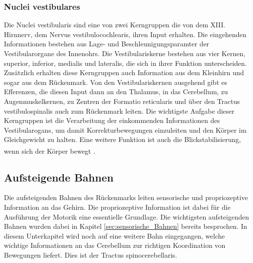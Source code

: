 \documentclass[12pt,a4paper,pdftex]{article}
\begin{document}
\subsubsection*{Nuclei vestibulares} 
Die Nuclei vestibularis sind eine von zwei Kerngruppen die von dem XIII. Hirnnerv, dem Nervus vestibulocochlearis, ihren Input erhalten. Die eingehenden Informationen bestehen aus Lage- und Beschleunigungsparamter der Vestibularorgane des Innenohrs. Die Vestibulariskerne bestehen aus vier Kernen, superior, inferior, medialis und lateralis, die sich in ihrer Funktion unterscheiden. Zusätzlich erhalten diese Kerngruppen auch Information aus dem Kleinhirn und sogar aus dem Rückenmark. Von den Vestibulariskernen ausgehend gibt es Efferenzen, die diesen Input dann an den Thalamus, in das Cerebellum, zu Augenmuskelkernen, zu Zentren der Formatio reticularis und über den Tractus vestibulospinalis auch zum Rückenmark leiten. Die wichtigste Aufgabe dieser Kerngruppen ist die Verarbeitung der einkommenden Informationen des Vestibularogans, um damit Korrekturbewegungen einzuleiten und den Körper im Gleichgewicht zu halten. Eine weitere Funktion ist auch die Blickstabilisierung, wenn sich der Körper bewegt \textsuperscript{\cite[5]{trepel2011neuroanatomie}}.  


\subsection{Aufsteigende Bahnen}
Die aufsteigenden Bahnen des Rückenmarks leiten sensorische und propriozeptive Information an das Gehirn. Die propriozeptive Information ist dabei für die Ausführung der Motorik eine essentielle Grundlage. Die wichtigsten aufsteigenden Bahnen wurden dabei in Kapitel \ref{sec:sensorische_Bahnen} bereits besprochen. In diesem Unterkapitel wird noch auf eine weitere Bahn eingegangen, welche wichtige Informationen an das Cerebellum zur richtigen Koordination von Bewegungen liefert. Dies ist der Tractus spinocerebellaris. 
\end{document}
